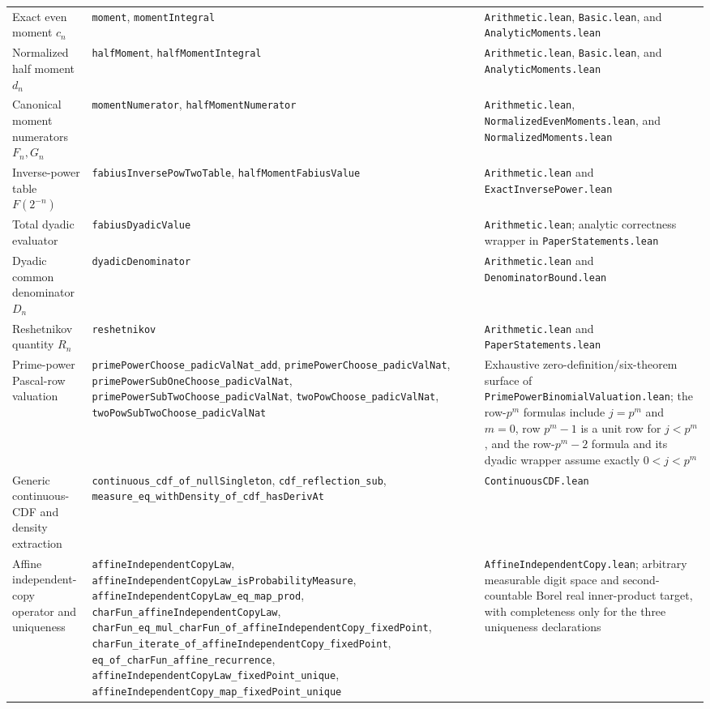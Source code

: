 \documentclass[11pt,oneside]{article}
\theoremstyle{definition}
\theoremstyle{remark}
\begin{document}
\begin{longtable}{@{}>{\raggedright\arraybackslash}p{} >{\raggedright\arraybackslash}p{} >{\raggedright\arraybackslash}p{}@{}}
Exact even moment \(c_n\) & \nolinkurl{moment}, \nolinkurl{momentIntegral} & \nolinkurl{Arithmetic.lean}, \nolinkurl{Basic.lean}, and \nolinkurl{AnalyticMoments.lean} \\
Normalized half moment \(d_n\) & \nolinkurl{halfMoment}, \nolinkurl{halfMomentIntegral} & \nolinkurl{Arithmetic.lean}, \nolinkurl{Basic.lean}, and \nolinkurl{AnalyticMoments.lean} \\
Canonical moment numerators \(F_n,G_n\) & \nolinkurl{momentNumerator}, \nolinkurl{halfMomentNumerator} & \nolinkurl{Arithmetic.lean}, \nolinkurl{NormalizedEvenMoments.lean}, and \nolinkurl{NormalizedMoments.lean} \\
Inverse-power table \(F(2^{-n})\) & \nolinkurl{fabiusInversePowTwoTable}, \nolinkurl{halfMomentFabiusValue} & \nolinkurl{Arithmetic.lean} and \nolinkurl{ExactInversePower.lean} \\
Total dyadic evaluator & \nolinkurl{fabiusDyadicValue} & \nolinkurl{Arithmetic.lean}; analytic correctness wrapper in \nolinkurl{PaperStatements.lean} \\
Dyadic common denominator \(D_n\) & \nolinkurl{dyadicDenominator} & \nolinkurl{Arithmetic.lean} and \nolinkurl{DenominatorBound.lean} \\
Reshetnikov quantity \(R_n\) & \nolinkurl{reshetnikov} & \nolinkurl{Arithmetic.lean} and \nolinkurl{PaperStatements.lean} \\
Prime-power Pascal-row valuation & \nolinkurl{primePowerChoose_padicValNat_add}, \nolinkurl{primePowerChoose_padicValNat}, \nolinkurl{primePowerSubOneChoose_padicValNat}, \nolinkurl{primePowerSubTwoChoose_padicValNat}, \nolinkurl{twoPowChoose_padicValNat}, \nolinkurl{twoPowSubTwoChoose_padicValNat} & Exhaustive zero-definition/six-theorem surface of \nolinkurl{PrimePowerBinomialValuation.lean}; the row-\(p^m\) formulas include \(j=p^m\) and \(m=0\), row \(p^m-1\) is a unit row for \(j<p^m\), and the row-\(p^m-2\) formula and its dyadic wrapper assume exactly \(0<j<p^m\) \\
Generic continuous-CDF and density extraction & \nolinkurl{continuous_cdf_of_nullSingleton}, \nolinkurl{cdf_reflection_sub}, \nolinkurl{measure_eq_withDensity_of_cdf_hasDerivAt} & \nolinkurl{ContinuousCDF.lean} \\
Affine independent-copy operator and uniqueness & \nolinkurl{affineIndependentCopyLaw}, \nolinkurl{affineIndependentCopyLaw_isProbabilityMeasure}, \nolinkurl{affineIndependentCopyLaw_eq_map_prod}, \nolinkurl{charFun_affineIndependentCopyLaw}, \nolinkurl{charFun_eq_mul_charFun_of_affineIndependentCopy_fixedPoint}, \nolinkurl{charFun_iterate_of_affineIndependentCopy_fixedPoint}, \nolinkurl{eq_of_charFun_affine_recurrence}, \nolinkurl{affineIndependentCopyLaw_fixedPoint_unique}, \nolinkurl{affineIndependentCopy_map_fixedPoint_unique} & \nolinkurl{AffineIndependentCopy.lean}; arbitrary measurable digit space and second-countable Borel real inner-product target, with completeness only for the three uniqueness declarations \\

\end{longtable}
\end{document}
